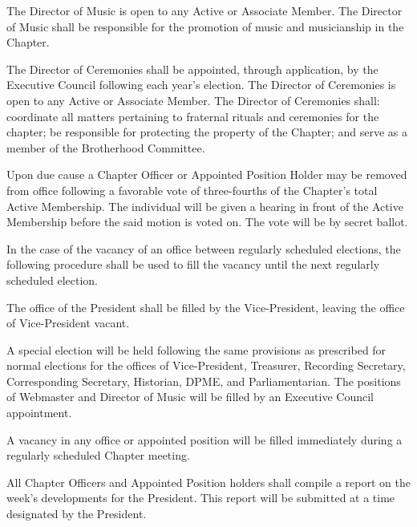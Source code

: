 \documentclass[11pt]{article}
\begin{document}
\begin{legal}
    The Director of Music is open to any Active or Associate Member. The Director of Music shall be responsible for the promotion of music and musicianship in the Chapter.
  \item
    The Director of Ceremonies shall be appointed, through application, by the Executive Council following each year's election.
    The Director of Ceremonies is open to any Active or Associate Member.
    The Director of Ceremonies shall: coordinate all matters pertaining to fraternal rituals and ceremonies for the chapter; be responsible for protecting the property of the Chapter; and serve as a member of the Brotherhood Committee. 
  \item
    Upon due cause a Chapter Officer or Appointed Position Holder may be removed from office following a favorable vote of three-fourths of the Chapter’s total Active Membership.
    The individual will be given a hearing in front of the Active Membership before the said motion is voted on.
    The vote will be by secret ballot.
  \item
    In the case of the vacancy of an office between regularly scheduled elections, the following procedure shall be used to fill the vacancy until the next regularly scheduled election.
    \begin{legal}
      \item
        The office of the President shall be filled by the Vice-President, leaving the office of Vice-President vacant.
      \item
        A special election will be held following the same provisions as prescribed for normal elections for the offices of Vice-President, Treasurer, Recording Secretary, Corresponding Secretary, Historian, DPME, and Parliamentarian. The positions of Webmaster and Director of Music will be filled by an Executive Council appointment.
      \item
        A vacancy in any office or appointed position will be filled immediately during a regularly scheduled Chapter meeting.
    \end{legal}
  \item
    All Chapter Officers and Appointed Position holders shall compile a report on the week’s developments for the President.
    This report will be submitted at a time designated by the President.
\end{legal}
\end{document}
